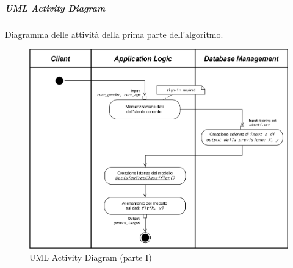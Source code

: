 \newpage


\subparagraph{UML Activity Diagram}
Diagramma delle attività della prima parte dell'algoritmo.
\begin{figure} [H]
    \centering
    \includegraphics[scale=0.7]{images/flowchart_1_UML_ver2.png}
    \caption{UML Activity Diagram (parte I)}
    \label{fig-uml-ac-1}
\end{figure}


\newpage
